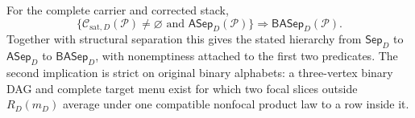 For the complete carrier and corrected stack,
\[
\{\mathcal C_{\mathrm{sat},D}(\mathcal P)\ne\varnothing\text{ and }\mathsf{ASep}_D(\mathcal P)\}
\Longrightarrow\mathsf{BASep}_D(\mathcal P).
\]
Together with structural separation this gives the stated hierarchy from \(\mathsf{Sep}_D\) to \(\mathsf{ASep}_D\) to \(\mathsf{BASep}_D\), with nonemptiness attached to the first two predicates.  The second implication is strict on original binary alphabets: a three-vertex binary DAG and complete target menu exist for which two focal slices outside \(R_D(m_D)\) average under one compatible nonfocal product law to a row inside it.